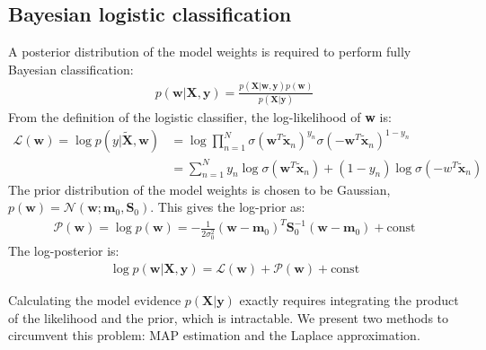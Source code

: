\documentclass[a4paper]{article}
\begin{document}
    \subsection{Bayesian logistic classification}
    A posterior distribution of the model weights is required to perform fully Bayesian classification:
    \begin{align}
        p(\bm{w} | \bm{X}, \bm{y}) = \frac{p(\bm{X} | \bm{w}, \bm{y}) p(\bm w)}{p(\bm{X} | \bm{y})}
        \label{eq:posterior}
    \end{align}
    From the definition of the logistic classifier, the log-likelihood of \textbf{w} is:
    \begin{align}
        \mathcal{L}(\bm{w}) = \log p(y|\tilde{\bm{X}}, \bm{w})
        &= \log \prod_{n=1}^{N} \sigma( \bm{w}^T \tilde{\bm{x}}_n)^{y_n}
        \sigma (-\bm{w}^T \tilde{\bm{x}}_n)^{1-y_n} \nonumber \\
        &= \sum_{n=1}^{N} y_n \log\sigma( \bm{w}^T \tilde{\bm{x}}_n) + (1-y_n) \log\sigma(-w^T \tilde{\bm{x}}_n)
        \label{eq:log-likelihood}
    \end{align}
    The prior distribution of the model weights is chosen to be Gaussian, $p(\bm{w}) = \mathcal{N}(\bm{w}; \bm{m}_0, \bm{S}_0)$.
    This gives the log-prior as:
    \begin{align}
        \mathcal{P}(\bm{w}) = \log p(\bm{w}) = -\frac{1}{2\sigma_0^2}(\bm{w} - \bm{m}_0)^T \bm{S}_0^{-1} (\bm{w} - \bm{m}_0) + \text{const}
        \label{eq:log-prior}
    \end{align}
    The log-posterior is:
    \begin{align}
        \log p(\bm{w} | \bm{X}, \bm{y}) = \mathcal{L}(\bm{w}) + \mathcal{P}(\bm{w}) + \text{const}
        \label{eq:log-posterior}
    \end{align}

    Calculating the model evidence $p(\bm{X} | \bm{y})$ exactly requires integrating the product of the likelihood and the prior, which is intractable.
    We present two methods to circumvent this problem: MAP estimation and the Laplace approximation.
\end{document}
